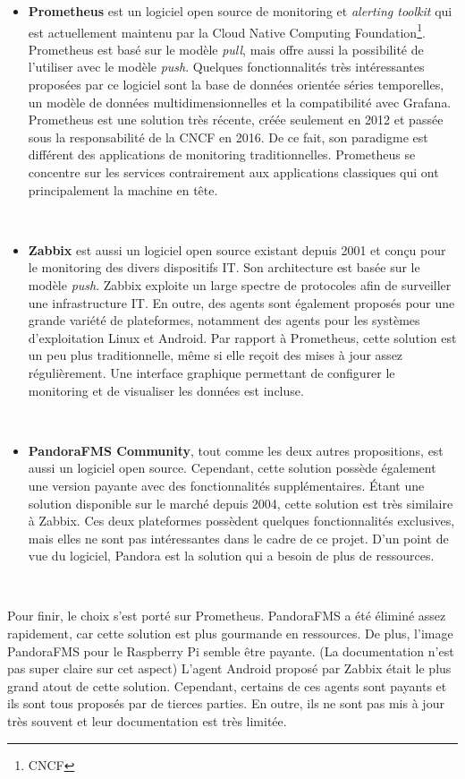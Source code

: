 \begin{itemize}
  \item \textbf{Prometheus} est un logiciel open source de monitoring et \textit{alerting toolkit} qui est actuellement maintenu par la Cloud Native Computing Foundation\footnote{CNCF}. Prometheus est basé sur le modèle \textit{pull}, mais offre aussi la possibilité de l'utiliser avec le modèle \textit{push}. Quelques fonctionnalités très intéressantes proposées par ce logiciel sont la base de données orientée séries temporelles, un modèle de données multidimensionnelles et la compatibilité avec Grafana. Prometheus est une solution très récente, créée seulement en 2012 et passée sous la responsabilité de la CNCF en 2016. De ce fait, son paradigme est différent des applications de monitoring traditionnelles. Prometheus se concentre sur les services \cite{prometheus_paradigm} contrairement aux applications classiques qui ont principalement la machine en tête.

  ~

  \item \textbf{Zabbix} est aussi un logiciel open source existant depuis 2001 et conçu pour le monitoring des divers dispositifs IT. Son architecture est basée sur le modèle \textit{push}. Zabbix exploite un large spectre de protocoles afin de surveiller une infrastructure IT. En outre, des agents sont également proposés pour une grande variété de plateformes, notamment des agents pour les systèmes d'exploitation Linux et Android. Par rapport à Prometheus, cette solution est un peu plus traditionnelle, même si elle reçoit des mises à jour assez régulièrement. Une interface graphique permettant de configurer le monitoring et de visualiser les données est incluse.

  ~

  \item \textbf{PandoraFMS Community}, tout comme les deux autres propositions, est aussi un logiciel open source. Cependant, cette solution possède également une version payante avec des fonctionnalités supplémentaires. Étant une solution disponible sur le marché depuis 2004, cette solution est très similaire à Zabbix. Ces deux plateformes possèdent quelques fonctionnalités exclusives, mais elles ne sont pas intéressantes dans le cadre de ce projet. D'un point de vue du logiciel, Pandora est la solution qui a besoin de plus de ressources.
\end{itemize}


~

\noindent
Pour finir, le choix s'est porté sur Prometheus. PandoraFMS a été éliminé assez rapidement, car cette solution est plus gourmande en ressources. De plus, l'image PandoraFMS pour le Raspberry Pi semble être payante. (La documentation n'est pas super claire sur cet aspect) L'agent Android proposé par Zabbix était le plus grand atout de cette solution. Cependant, certains de ces agents sont payants et ils sont tous proposés par de tierces parties. En outre, ils ne sont pas mis à jour très souvent et leur documentation est très limitée.

